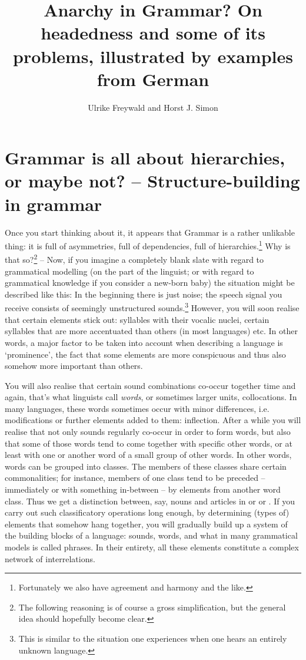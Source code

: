 \documentclass[output=paper
  ,nobabel
  ,draftmode
  ,colorlinks, citecolor=brown
]{langscibook}
\title[Anarchy in Grammar?]{Anarchy in Grammar? On headedness and some of its problems, illustrated by examples from German}
\author{Ulrike Freywald\orcid{0000-0003-3268-7874}\affiliation{TU Dortmund} and Horst J. Simon\orcid{0000-0002-6367-2969}\affiliation{Freie Universität Berlin}}
\begin{document}
\maketitle

\section{Grammar is all about hierarchies, or maybe not? – Structure-building in grammar}

\largerpage
Once you start thinking about it, it appears that Grammar is a rather unlikable thing: it is full of
asymmetries, full of dependencies, full of hierarchies.\footnote{Fortunately we also have agreement
  and harmony and the like.} Why is that so?\footnote{The following reasoning is of course a gross
  simplification, but the general idea should hopefully become clear.} – Now, if you imagine a
completely blank slate with regard to grammatical modelling (on the part of the linguist; or with
regard to grammatical knowledge if you consider a new-born baby) the situation might be described
like this: In the beginning there is just noise; the speech signal you receive consists of seemingly
unstructured sounds.\footnote{This is similar to the situation one experiences when one hears an
  entirely unknown language.} However, you will soon realise that certain elements stick out:
syllables with their vocalic nuclei, certain syllables that are more accentuated than others (in
most languages) etc. In other words, a major factor to be taken into account when describing a
language is `prominence', the fact that some elements are more conspicuous and thus also somehow
more important than others.

You will also realise that certain sound combinations co-occur together time and again, that's what
linguists call \emph{words}, or sometimes larger units, collocations. In many languages, these
words sometimes occur with minor differences, i.e. modifications or further elements added to them:
inflection. After a while you will realise that not only sounds regularly co-occur in order to form
words, but also that some of those words tend to come together with specific other words, or at
least with one or another word of a small group of other words. In other words, words can be grouped
into classes. The members of these classes share certain commonalities; for instance, members of one
class tend to be preceded – immediately or with something in-between – by elements from another word
class. Thus we get a distinction between, say, nouns and articles in  or  or . If
you carry out such classificatory operations long enough, by determining (types of) elements that
somehow hang together, you will gradually build up a system of the building blocks of a language:
sounds, words, and what in many grammatical models is called phrases. In their entirety, all these
elements constitute a complex network of interrelations.
\end{document}
